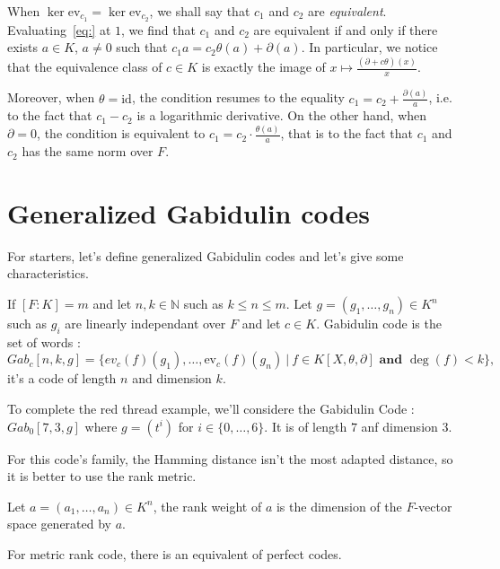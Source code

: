 \documentclass[a4paper]{llncs}
\newcommand{\id}{\textrm{id}}
\newcommand{\ev}[1]{\textrm{ev}_{#1}}
\begin{document}
When $\ker \ev{c_1} = \ker \ev{c_2}$, we shall say that $c_1$
and $c_2$ are \emph{equivalent}. Evaluating~\eqref{eq:} at $1$,
we find that $c_1$ and $c_2$ are equivalent if and only if there
exists $a \in K$, $a \neq 0$ such that
$c_1 a = c_2 \theta(a) + \partial(a)$. In particular, we notice 
that the equivalence class of $c \in K$ is exactly the image of 
$x \mapsto \frac{(\partial + c\theta)(x)} x$.

Moreover, when $\theta = \id$, the condition resumes to the equality 
$c_1 = c_2 + \frac{\partial(a)} a$, i.e. to the fact that $c_1 - c_2$ is 
a logarithmic derivative. On the other hand, when $\partial = 0$, the 
condition is equivalent to $c_1 = c_2 \cdot \frac{\theta(a)}a$, that is 
to the fact that $c_1$ and $c_2$ has the same norm over $F$.



\section{Generalized Gabidulin codes}

For starters, let's define generalized Gabidulin codes and let's give some characteristics.

\begin{definition}
If $[F:K] = m$ and let $n, k \in \mathbb{N}$ such as $k \leqslant n \leqslant m$. Let $g=(g_1, \dots, g_n) \in K^n$ such as $g_i$ are linearly independant over $F$ and let $c \in K$. Gabidulin code is the set of words : 
$$Gab_c[n,k,g] =\{ ev_c(f)(g_1), \dots, \ev{c}(f)(g_n)\ | \ f \in K[X, \theta, \partial] \textbf{ and } \deg(f)<k\},$$
it's a code of length $n$ and dimension $k$.
\end{definition}

\begin{example}
To complete the red thread example, we'll considere the Gabidulin Code : $Gab_0[7,3,g]$ where $g = (t^i)$ for $i \in \{0, \dots, 6\}$. It is of length  $7$ anf dimension $3$.
\end{example}

For this code's family, the Hamming distance isn't the most adapted distance, so it is better to use the rank metric.

\begin{definition}
Let $a = (a_1, \dots, a_n) \in K^n$, the rank weight of $a$ is the dimension of the $F$-vector space generated by $a$.
\end{definition}

For metric rank code, there is an equivalent of perfect codes. 
\end{document}
